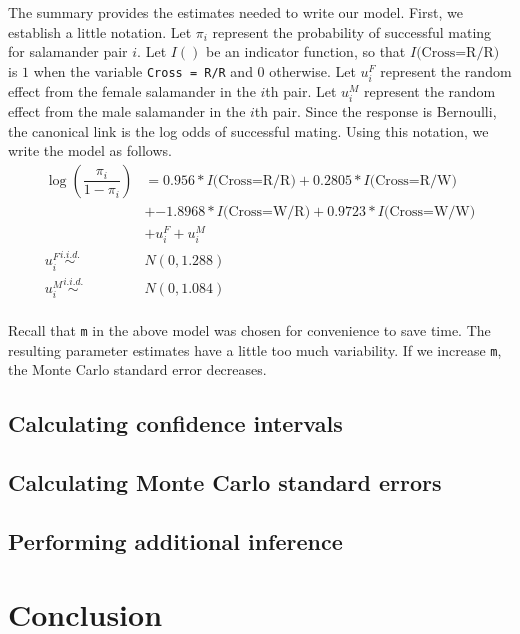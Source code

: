 \documentclass[article]{jss}
\begin{document}
The summary provides the estimates needed to write our model. First, we establish a little notation. Let $\pi_i$ represent the probability of successful mating for salamander pair $i$. Let $I()$ be an indicator function, so that $I\text{(Cross=R/R)}$ is $1$ when the variable \texttt{Cross = R/R} and 0 otherwise. Let $u_i^F$ represent the random effect from the female salamander in the $i$th pair. Let $u_i^M$ represent the random effect from the male salamander in the $i$th pair. Since the response is Bernoulli, the canonical link is the log odds of successful mating. Using this notation, we write the model as follows.\\
\begin{align*}
\log \left( \dfrac{\pi_i}{1-\pi_i} \right) &= 0.956 * I\text{(Cross=R/R)} + 0.2805 * I\text{(Cross=R/W)}\\
 &+ \ensuremath{-1.8968} * I\text{(Cross=W/R)}
+ 0.9723 * I\text{(Cross=W/W)}\\
 &+ u_i^F+u_i^M\\
u_i^F \overset{i.i.d.}{\sim} &N(0,1.288)\\
u_i^M \overset{i.i.d.}{\sim} &N(0,1.084)\\
\end{align*}

Recall that \texttt{m}  in the above model was chosen for convenience to save time. The resulting parameter estimates have a little too much variability. If we increase \texttt{m}, the Monte Carlo standard error decreases. 


\subsection{Calculating confidence intervals}

\subsection{Calculating Monte Carlo standard errors}

\subsection{Performing additional inference}


\section{Conclusion}


\end{document}
